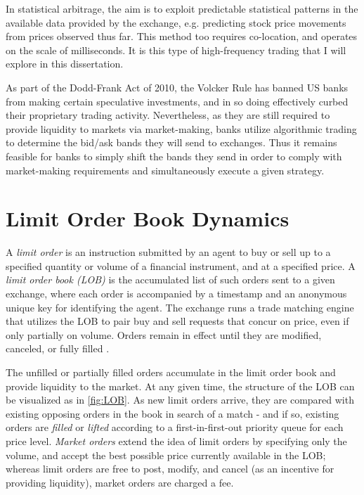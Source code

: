 In statistical arbitrage, the aim is to exploit predictable statistical patterns in the available data provided by the exchange, e.g. predicting stock price movements from prices observed thus far. This method too requires co-location, and operates on the scale of milliseconds. It is this type of high-frequency trading that I will explore in this dissertation. 

As part of the Dodd-Frank Act of 2010, the Volcker Rule has banned US banks from making certain speculative investments, and in so doing effectively curbed their proprietary trading activity. Nevertheless, as they are still required to provide liquidity to markets via market-making, banks utilize algorithmic trading to determine the bid/ask bands they will send to exchanges. Thus it remains feasible for banks to simply shift the bands they send in order to comply with market-making requirements and simultaneously execute a given strategy.

\section{Limit Order Book Dynamics}

A \emph{limit order} is an instruction submitted by an agent to buy or sell up to a specified quantity or volume of a financial instrument, and at a specified price. A \emph{limit order book (LOB)} is the accumulated list of such orders sent to a given exchange, where each order is accompanied by a timestamp and an anonymous unique key for identifying the agent. The exchange runs a trade matching engine that utilizes the LOB to pair buy and sell requests that concur on price, even if only partially on volume. Orders remain in effect until they are modified, canceled, or fully filled \cite{Kyle1989}.

The unfilled or partially filled orders accumulate in the limit order book and provide liquidity to the market. At any given time, the structure of the LOB can be visualized as in \autoref{fig:LOB}. As new limit orders arrive, they are compared with existing opposing orders in the book in search of a match - and if so, existing orders are \emph{filled} or \emph{lifted} according to a first-in-first-out priority queue for each price level. \emph{Market orders} extend the idea of limit orders by specifying only the volume, and accept the best possible price currently available in the LOB; whereas limit orders are free to post, modify, and cancel (as an incentive for providing liquidity), market orders are charged a fee.

